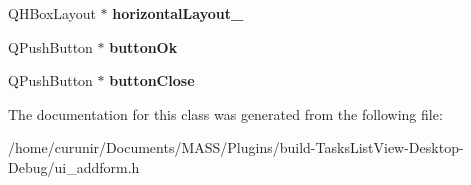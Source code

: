 \begin{DoxyCompactItemize}
\item 
Q\+H\+Box\+Layout $\ast$ {\bfseries horizontal\+Layout\+\_}\hypertarget{class_ui___add_form_abc192464f9c391d7f90faa6156cd5ac6}{}\label{class_ui___add_form_abc192464f9c391d7f90faa6156cd5ac6}

\item 
Q\+Push\+Button $\ast$ {\bfseries button\+Ok}\hypertarget{class_ui___add_form_a6f4cdce13483258e59719a2c184200d3}{}\label{class_ui___add_form_a6f4cdce13483258e59719a2c184200d3}

\item 
Q\+Push\+Button $\ast$ {\bfseries button\+Close}\hypertarget{class_ui___add_form_ae6f4a43836ad2a122492e6e4849e688a}{}\label{class_ui___add_form_ae6f4a43836ad2a122492e6e4849e688a}

\end{DoxyCompactItemize}


The documentation for this class was generated from the following file\+:\begin{DoxyCompactItemize}
\item 
/home/curunir/\+Documents/\+M\+A\+S\+S/\+Plugins/build-\/\+Tasks\+List\+View-\/\+Desktop-\/\+Debug/ui\+\_\+addform.\+h\end{DoxyCompactItemize}
